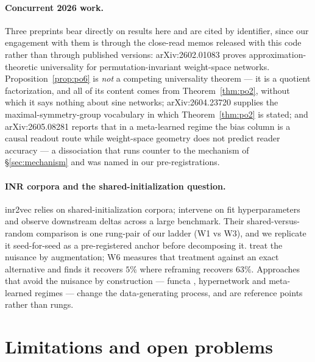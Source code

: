 \documentclass[10pt,letterpaper]{article}
\theoremstyle{definition}
\begin{document}
\paragraph{Concurrent 2026 work.} Three preprints bear directly on results here and are cited by
identifier, since our engagement with them is through the close-read memos released with this code
rather than through published versions: arXiv:2602.01083 proves approximation-theoretic
universality for permutation-invariant weight-space networks. Proposition~\ref{prop:po6} is
\emph{not} a competing universality theorem --- it is a quotient factorization, and all of its
content comes from Theorem~\ref{thm:po2}, without which it says nothing about sine networks;
arXiv:2604.23720 supplies the maximal-symmetry-group vocabulary in which
Theorem~\ref{thm:po2} is stated; and arXiv:2605.08281 reports that in a meta-learned regime the
bias column is a causal readout route while weight-space geometry does not predict reader accuracy
--- a dissociation that runs counter to the mechanism of \S\ref{sec:mechanism} and was named in
our pre-registrations.

\paragraph{INR corpora and the shared-initialization question.} inr2vec \citep{deluigi2023inr2vec}
relies on shared-initialization corpora; \citet{papa2024howtotrain} intervene on fit
hyperparameters and observe downstream deltas across a large benchmark. Their shared-versus-random
comparison is one rung-pair of our ladder (W1 vs W3), and we replicate it seed-for-seed as a
pre-registered anchor before decomposing it. \citet{shamsian2024augmentations} treat the nuisance
by augmentation; W6 measures that treatment against an exact alternative and finds it recovers
$5\%$ where reframing recovers $63\%$. Approaches that avoid the nuisance by construction ---
functa \citep{dupont2022functa}, hypernetwork and meta-learned regimes --- change the
data-generating process, and are reference points rather than rungs.

\section{Limitations and open problems}\label{sec:limits}
\end{document}
